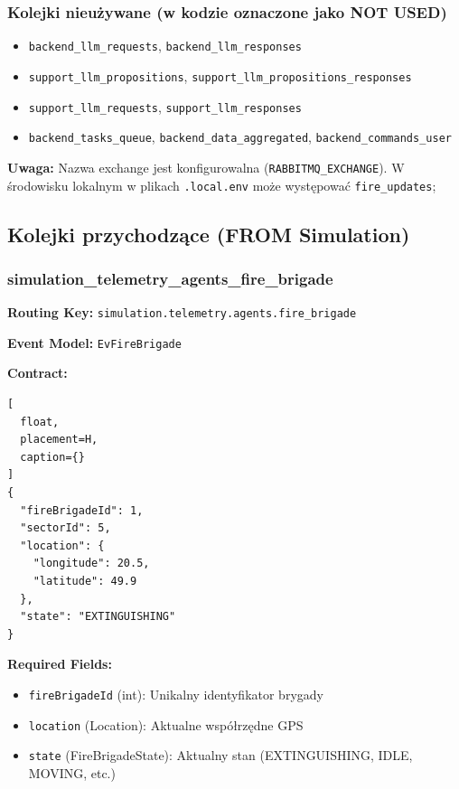 \subsubsection{Kolejki nieużywane (w kodzie oznaczone jako NOT USED)}
\begin{itemize}
  \item \texttt{backend\_llm\_requests}, \texttt{backend\_llm\_responses}
  \item \texttt{support\_llm\_propositions}, \texttt{support\_llm\_propositions\_responses}
  \item \texttt{support\_llm\_requests}, \texttt{support\_llm\_responses}
  \item \texttt{backend\_tasks\_queue}, \texttt{backend\_data\_aggregated}, \texttt{backend\_commands\_user}
\end{itemize}

\textbf{Uwaga:} Nazwa exchange jest konfigurowalna (\texttt{RABBITMQ\_EXCHANGE}). W środowisku lokalnym w plikach \texttt{.local.env} może występować \texttt{fire\_updates};

\subsection{Kolejki przychodzące (FROM Simulation)}

\subsubsection{simulation\_telemetry\_agents\_fire\_brigade}

\textbf{Routing Key:} \texttt{simulation.telemetry.agents.fire\_brigade}

\textbf{Event Model:} \texttt{EvFireBrigade}

\textbf{Contract:}
\begin{lstlisting}[
  float,
  placement=H,
  caption={}
]
{
  "fireBrigadeId": 1,
  "sectorId": 5,
  "location": {
    "longitude": 20.5,
    "latitude": 49.9
  },
  "state": "EXTINGUISHING"
}
\end{lstlisting}

\textbf{Required Fields:}
\begin{itemize}
    \item \texttt{fireBrigadeId} (int): Unikalny identyfikator brygady
    \item \texttt{location} (Location): Aktualne współrzędne GPS
    \item \texttt{state} (FireBrigadeState): Aktualny stan (EXTINGUISHING, IDLE, MOVING, etc.)
\end{itemize}

